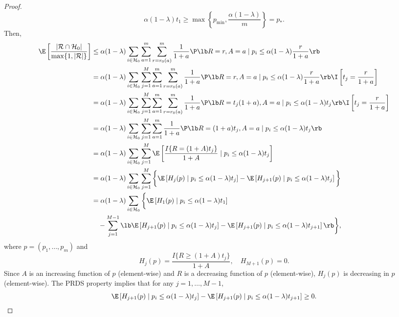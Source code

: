 \begin{proof}
  \begin{equation}
    \label{eq:t1}
    \alpha(1 - \lambda)t_1 \ge \max\left\{p_{\min}, \frac{\alpha(1 - \lambda)}{m}\right\} = p_{*}.
  \end{equation}
  Then,
  \begin{align*}
    \E\left[\frac{|\mathcal{R} \cap \mathcal{H}_0|}{\max\{1, |\mathcal{R}|\} } \right]
    & \leq \alpha(1 - \lambda)\sum_{i\in \mathcal{H}_0}\sum_{a = 1}^{m}\sum_{r = r_{0}(a)}^{m}\frac{1}{1 + a}\P\lb R = r, A = a\mid p_i \le \alpha(1 - \lambda)\frac{r}{1 + a}\rb \\
    & = \alpha(1 - \lambda)\sum_{i\in \mathcal{H}_0} \sum_{j=1}^{M}\sum_{a = 1}^{m} \sum_{r = r_{0}(a)}^{m} \frac{1}{1 + a}\P\lb R = r, A = a\mid p_i \le \alpha(1 - \lambda)\frac{r}{1 + a}\rb \I\left[t_j = \frac{r}{1+a}\right]\\
    & = \alpha(1 - \lambda)\sum_{i\in \mathcal{H}_0} \sum_{j=1}^{M} \sum_{a = 1}^{m} \sum_{r = r_{0}(a)}^{m} \frac{1}{1 + a}\P\lb R = t_j(1+a), A = a\mid p_i \le \alpha(1 - \lambda) t_j \rb \I\left[t_j = \frac{r}{1+a}\right]\\
& = \alpha(1 - \lambda)\sum_{i\in \mathcal{H}_0}\sum_{j=1}^{M}\sum_{a = 1}^{m}\frac{1}{1 + a}\P\lb R = (1 + a)t_j, A = a\mid p_i \le \alpha(1 - \lambda)t_j\rb\\
         & = \alpha(1 - \lambda)\sum_{i\in \mathcal{H}_0}\sum_{j=1}^{M}\E\left[ \frac{I\{R = (1 + A)t_j\}}{1 + A}\mid p_i \le \alpha(1 - \lambda)t_j\right]\\
         & = \alpha(1 - \lambda)\sum_{i\in \mathcal{H}_0}\sum_{j=1}^{M}\bigg\{\E\left[ H_j(p)\mid p_i \le \alpha(1 - \lambda)t_j\right] - \E\left[ H_{j+1}(p)\mid p_i \le \alpha(1 - \lambda)t_j\right]\bigg\}\\
         & = \alpha(1 - \lambda)\sum_{i\in \mathcal{H}_0}\bigg\{\E\left[ H_1(p)\mid p_i \le \alpha(1 - \lambda)t_1\right] \\
    & \quad - \sum_{j=1}^{M-1}\lb\E\left[ H_{j+1}(p)\mid p_i \le \alpha(1 - \lambda)t_j\right] - \E\left[ H_{j+1}(p)\mid p_i \le \alpha(1 - \lambda)t_{j+1}\right]\rb\bigg\},
  \end{align*}
  where $p = (p_1,\ldots,p_m)$ and
  \[H_j(p) = \frac{I\{R\ge (1 + A)t_j\}}{1 + A}, \quad H_{M+1}(p) = 0.\]
  Since $A$ is an increasing function of $p$ (element-wise) and $R$ is a decreasing function of $p$ (element-wise), $H_j(p)$ is decreasing in $p$ (element-wise). The PRDS property implies that for any $j = 1, \ldots, M - 1$,
  \[\E\left[ H_{j+1}(p)\mid p_i \le \alpha(1 - \lambda)t_j\right] - \E\left[ H_{j+1}(p)\mid p_i \le \alpha(1 - \lambda)t_{j+1}\right]\ge 0.\]

\end{proof}
